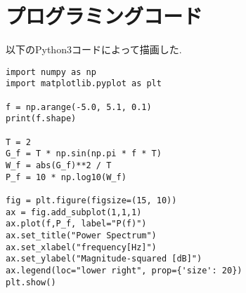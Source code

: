 \documentclass{jsarticle}           %
\theoremstyle{plain}
\theoremstyle{definition}
\theoremstyle{remark}
\begin{document}
    
\section{プログラミングコード}
以下のPython3コードによって描画した.
\begin{lstlisting}[basicstyle=\ttfamily\footnotesize, frame=single]
import numpy as np
import matplotlib.pyplot as plt

f = np.arange(-5.0, 5.1, 0.1)
print(f.shape)

T = 2
G_f = T * np.sin(np.pi * f * T)
W_f = abs(G_f)**2 / T
P_f = 10 * np.log10(W_f)

fig = plt.figure(figsize=(15, 10))
ax = fig.add_subplot(1,1,1)
ax.plot(f,P_f, label="P(f)")
ax.set_title("Power Spectrum")
ax.set_xlabel("frequency[Hz]")
ax.set_ylabel("Magnitude-squared [dB]")
ax.legend(loc="lower right", prop={'size': 20})
plt.show()
\end{lstlisting}
        


        

\printindex
\end{document}
